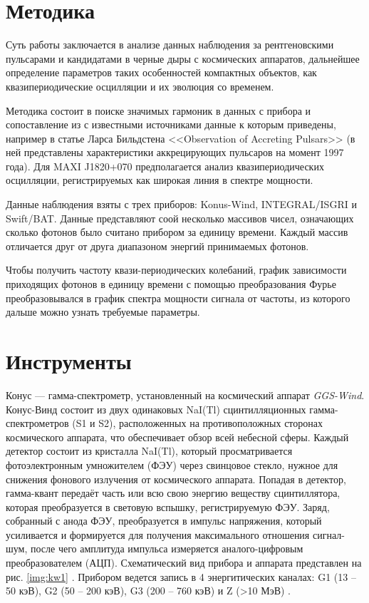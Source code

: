 \section{Методика}

	Суть работы заключается в анализе данных наблюдения за рентгеновскими пульсарами и кандидатами в черные дыры с космических аппаратов, дальнейшее определение параметров таких особенностей компактных объектов, как квазипериодические осцилляции и их эволюция со временем.

	Методика состоит в поиске значимых гармоник в данных с прибора и сопоставление из с известными источниками данные к которым приведены, например в статье Ларса Бильдстена <<Observation of Accreting Pulsars>> (в ней представлены характеристики аккрецирующих пульсаров на момент 1997 года). Для MAXI J1820+070 предполагается анализ квазипериодических осцилляции, регистрируемых как широкая линия в спектре мощности.
	
	Данные наблюдения взяты с трех приборов: Konus-Wind, INTEGRAL/ISGRI и Swift/BAT. Данные представляют соой несколько массивов чисел, означающих сколько фотонов было считано прибором за единицу времени. Каждый массив отличается друг от друга диапазоном энергий принимаемых фотонов.
	
	Чтобы получить частоту квази-периодических колебаний, график зависимости приходящих фотонов в единицу времени с помощью преобразования Фурье преобразовывался в график спектра мощности сигнала от частоты, из которого дальше можно узнать требуемые параметры.
	

\section{Инструменты}
	
	Конус --- гамма-спектрометр, установленный на космический аппарат \textit{GGS-Wind}. Конус-Винд состоит из двух одинаковых NaI(Tl) сцинтилляционных гамма-спектрометров (S1 и S2), расположенных на противоположных сторонах космического аппарата, что обеспечивает обзор всей небесной сферы. Каждый детектор состоит из кристалла NaI(Tl), который  просматривается фотоэлектронным умножителем (ФЭУ) через свинцовое стекло, нужное для снижения фонового излучения от космического аппарата. Попадая в детектор, гамма-квант передаёт часть или всю свою энергию
веществу сцинтиллятора, которая преобразуется в световую вспышку, регистрируемую ФЭУ. Заряд, собранный с анода ФЭУ, преобразуется в импульс напряжения, который усиливается и формируется для получения максимального отношения сигнал-шум, после чего амплитуда импульса измеряется аналого-цифровым преобразователем (АЦП). Схематический вид прибора и аппарата представлен на рис. \ref{img:kw1} \cite{Svinkin_thesis}. Прибором ведется запись в 4 энергитических каналах: G1 (13 -- 50 кэВ), G2 (50 -- 200 кэВ), G3 (200 -- 760 кэВ) и Z (>10 МэВ) \cite{aptekarr.l.1993}.


